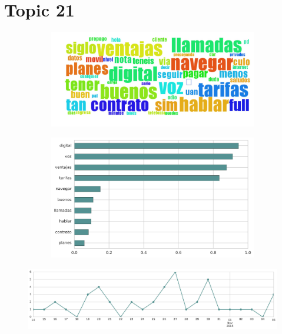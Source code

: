 \section{Topic 21}

\begin{figure}[htbp!]
    \centering
    \begin{subfigure}[b]{0.49\textwidth}
        \includegraphics[width=\textwidth]{twitter_all/report_images/topic-21-wordcloud.jpg}
    \end{subfigure}
    \begin{subfigure}[b]{0.49\textwidth}
        \includegraphics[width=\textwidth]{twitter_all/report_images/topic-21-terms.jpg}
    \end{subfigure}
\end{figure}

\begin{figure}[htbp!]
    \centering
    \includegraphics[width=\textwidth]{twitter_all/report_images/topic-21-timeseries.jpg}
\end{figure}

